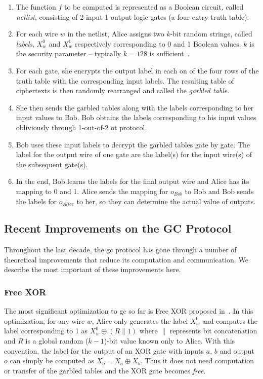 \begin{enumerate}[label=\roman*.]
\item The function $f$ to be computed is represented as a Boolean circuit, called \textit{netlist}, consisting of 2-input 1-output logic gates (a four entry truth table).
\item For each wire $w$ in the netlist, Alice assigns two $k$-bit random strings, called \textit{labels}, $X_w^{0}$ and $X_w^{1}$ respectively corresponding to 0 and 1 Boolean values.
      $k$ is the security parameter -- typically $k=128$ is sufficient~\cite{bellare2013efficient}.
\item For each gate, she encrypts the output label in each on of the four rows of the truth table with the corresponding input labels.
      The resulting table of ciphertexts is then randomly rearranged and called the \textit{garbled table}.
\item She then sends the garbled tables along with the labels corresponding to her input values to Bob.
      Bob obtains the labels corresponding to his input values obliviously through 1-out-of-2 \acrshort{ot} protocol.
\item Bob uses these input labels to decrypt the garbled tables gate by gate.
      The label for the output wire of one gate are the label(s) for the input wire(s) of the subsequent gate(s).
\item In the end, Bob learns the labels for the final output wire and Alice has its mapping to 0 and 1.
      Alice sends the mapping for $o_{Bob}$ to Bob and Bob sends the labels for $o_{Alice}$ to her, so they can determine the actual value of outputs.
\end{enumerate}

\subsection{Recent Improvements on the GC Protocol}\label{ssec:prelim-imp}
Throughout the last decade, the \acrshort{gc} protocol has gone through a number of theoretical improvements that reduce its computation and communication.
We describe the most important of these improvements here.

\subsubsection{Free XOR}\label{sssec:prelim-freexor}
The most significant optimization to \acrshort{gc} so far is Free XOR proposed in~\cite{kolesnikov2008improved}.
In this optimization, for any wire $w$, Alice only generates the label $X_w^{0}$ and computes the label corresponding to 1 as $X_w^{0}\oplus (R \parallel 1)$ where $\parallel$ represents bit concatenation and
$R$ is a global random ($k-1$)-bit value known only to Alice.
With this convention, the label for the output of an XOR gate with inputs $a$, $b$ and output $o$ can simply be computed as $X_{o} = X_{a} \oplus X_{b}$.
Thus it does not need computation or transfer of the garbled tables and the XOR gate becomes \textit{free}.

